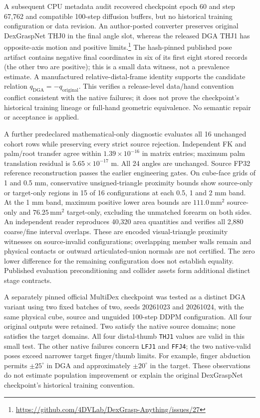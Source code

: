 \documentclass[10pt,letterpaper]{article}
\begin{document}
A subsequent CPU metadata audit recovered checkpoint epoch 60 and step 67,762 and
compatible 100-step diffusion buffers, but no historical training configuration
or data revision. An author-posted converter preserves original DexGraspNet
THJ0 in the final angle slot, whereas the released DGA THJ1 has opposite-axis
motion and positive limits.\footnote{\url{https://github.com/4DVLab/DexGrasp-Anything/issues/27}}
The hash-pinned published pose artifact contains negative final coordinates in
six of its first eight stored records (the other two are positive); this is a
small data witness, not a prevalence estimate. A manufactured relative-distal-frame
identity supports the candidate relation $q_{\mathrm{DGA}}=-q_{\mathrm{original}}$.
This verifies a release-level data/hand convention conflict consistent with the
native failures; it does not prove the checkpoint's historical training lineage
or full-hand geometric equivalence. No semantic repair or acceptance is applied.

A further predeclared mathematical-only diagnostic evaluates all 16 unchanged
cohort rows while preserving every strict source rejection. Independent FK and
palm/root transfer agree within $1.39\times10^{-16}$ in matrix entries; maximum
palm translation residual is $5.65\times10^{-17}$ m. All 24 angles are unchanged.
Source FP32 reference reconstruction passes the earlier engineering gates.
On cube-face grids of 1 and 0.5 mm, conservative unsigned-triangle proximity
bounds show source-only or target-only regions in 15 of 16 configurations at
each 0.5, 1 and 2 mm band. At the 1 mm band, maximum positive lower area bounds
are $111.0\,\mathrm{mm}^2$ source-only and $76.25\,\mathrm{mm}^2$ target-only,
excluding the unmatched forearm on both sides. An independent reader reproduces
40,320 area quantities and verifies all 2,880 coarse/fine interval overlaps.
These are encoded visual-triangle proximity witnesses on source-invalid
configurations; overlapping member walls remain and physical contacts or
outward articulated-union normals are not certified. The zero lower difference
for the remaining configuration does not establish equality. Published evaluation
preconditioning and collider assets form additional distinct stage contracts.

A separately pinned official MultiDex checkpoint was tested as a distinct DGA
variant using two fixed batches of two, seeds 20261023 and 20261024, with the same
physical cube, source and unguided 100-step DDPM configuration. All four original
outputs were retained. Two satisfy the native source domains; none satisfies the
target domains. All four distal-thumb \texttt{THJ1} values are valid in this small
test. The other native failures concern \texttt{LFJ1} and \texttt{FFJ4}; the two
native-valid poses exceed narrower target finger/thumb limits. For example,
finger abduction permits $\pm25^\circ$ in DGA and approximately $\pm20^\circ$ in
the target. These observations do not estimate population improvement or explain
the original DexGraspNet checkpoint's historical training convention.
\end{document}

